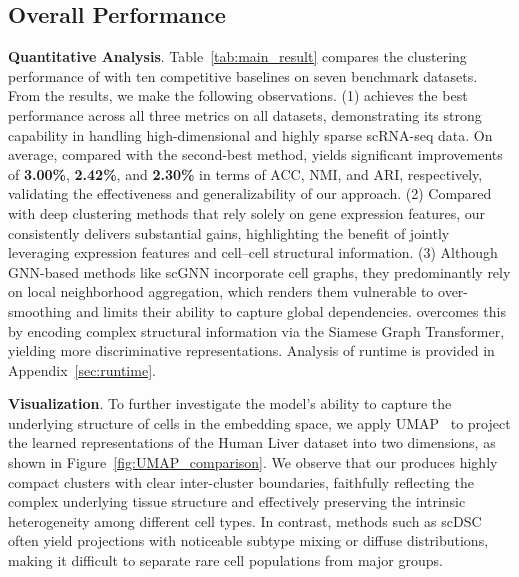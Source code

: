 

\subsection{Overall Performance}

\smallskip\noindent\textbf{Quantitative Analysis}. Table~\ref{tab:main_result} compares the clustering performance of \method{} with ten competitive baselines on seven benchmark datasets. From the results, we make the following observations. 
(1) \method{} achieves the best performance across all three metrics on all datasets, demonstrating its strong capability in handling high-dimensional and highly sparse scRNA-seq data. On average, compared with the second-best method, \method{} yields significant improvements of \textbf{3.00\%}, \textbf{2.42\%}, and \textbf{2.30\%} in terms of ACC, NMI, and ARI, respectively, validating the effectiveness and generalizability of our approach.
(2) Compared with deep clustering methods that rely solely on gene expression features, our \method{} consistently delivers substantial gains, highlighting the benefit of jointly leveraging expression features and cell--cell structural information.
(3) Although GNN-based methods like scGNN incorporate cell graphs, they predominantly rely on local neighborhood aggregation, which renders them vulnerable to over-smoothing and limits their ability to capture global dependencies. \method{} overcomes this by encoding complex structural information via the Siamese Graph Transformer, yielding more discriminative representations. Analysis of runtime is provided in Appendix~\ref{sec:runtime}.

\smallskip\noindent\textbf{Visualization}. To further investigate the model's ability to capture the underlying structure of cells in the embedding space, we apply UMAP~\cite{mcinnes2020umap} to project the learned representations of the Human Liver dataset into two dimensions, as shown in Figure~\ref{fig:UMAP_comparison}. We observe that our \method{} produces highly compact clusters with clear inter-cluster boundaries, faithfully reflecting the complex underlying tissue structure and effectively preserving the intrinsic heterogeneity among different cell types. In contrast, methods such as scDSC often yield projections with noticeable subtype mixing or diffuse distributions, making it difficult to separate rare cell populations from major groups.

